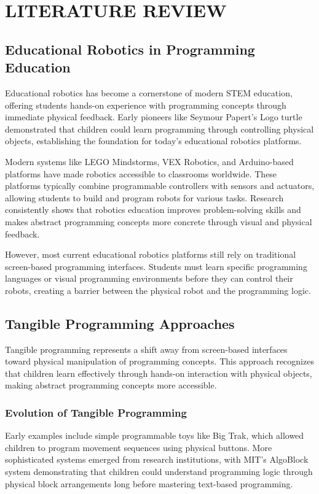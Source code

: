 \chapter{LITERATURE REVIEW}

\section{Educational Robotics in Programming Education}

Educational robotics has become a cornerstone of modern STEM education, offering students hands-on experience with programming concepts through immediate physical feedback. Early pioneers like Seymour Papert's Logo turtle demonstrated that children could learn programming through controlling physical objects, establishing the foundation for today's educational robotics platforms.

Modern systems like LEGO Mindstorms, VEX Robotics, and Arduino-based platforms have made robotics accessible to classrooms worldwide. These platforms typically combine programmable controllers with sensors and actuators, allowing students to build and program robots for various tasks. Research consistently shows that robotics education improves problem-solving skills and makes abstract programming concepts more concrete through visual and physical feedback.

However, most current educational robotics platforms still rely on traditional screen-based programming interfaces. Students must learn specific programming languages or visual programming environments before they can control their robots, creating a barrier between the physical robot and the programming logic.

\section{Tangible Programming Approaches}

Tangible programming represents a shift away from screen-based interfaces toward physical manipulation of programming concepts. This approach recognizes that children learn effectively through hands-on interaction with physical objects, making abstract programming concepts more accessible.

\subsection{Evolution of Tangible Programming}

Early examples include simple programmable toys like Big Trak, which allowed children to program movement sequences using physical buttons. More sophisticated systems emerged from research institutions, with MIT's AlgoBlock system demonstrating that children could understand programming logic through physical block arrangements long before mastering text-based programming.

